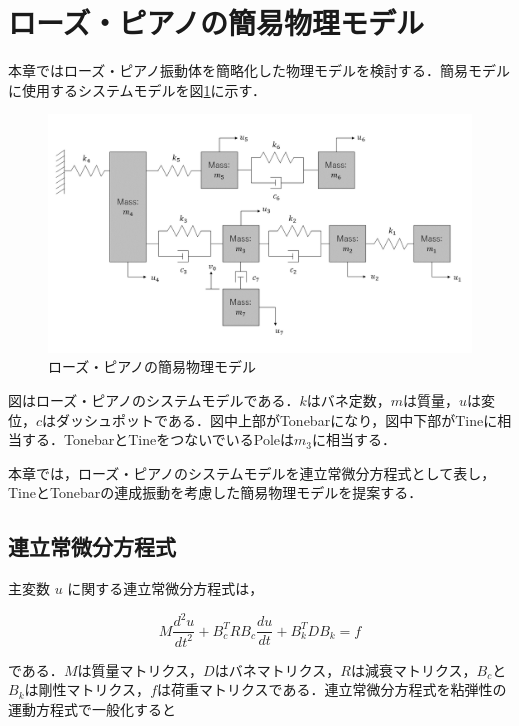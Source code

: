 \section{ローズ・ピアノの簡易物理モデル}

本章ではローズ・ピアノ振動体を簡略化した物理モデルを検討する．簡易モデルに使用するシステムモデルを図\ref{fig:簡易モデル}に示す．

\begin{figure}
    \centering
    \includegraphics[width=15cm]{img/system-model.png}
    \caption{ローズ・ピアノの簡易物理モデル}
    \label{fig:簡易モデル}
\end{figure}


図はローズ・ピアノのシステムモデルである．$k$はバネ定数，$m$は質量，$u$は変位，$c$はダッシュポットである．図中上部がTonebarになり，図中下部がTineに相当する．TonebarとTineをつないでいるPoleは$m_3$に相当する．

本章では，ローズ・ピアノのシステムモデルを連立常微分方程式として表し，TineとTonebarの連成振動を考慮した簡易物理モデルを提案する．



\subsection{連立常微分方程式}

主変数 $u$ に関する連立常微分方程式は，

\begin{equation}
    M \frac{d^2 u}{dt^2} + B_c^T R B_c \frac{du}{dt} + B_k^T D B_k = f    
\end{equation}

である．$M$は質量マトリクス，$D$はバネマトリクス，$R$は減衰マトリクス，$B_c$と$B_k$は剛性マトリクス，$f$は荷重マトリクスである．連立常微分方程式を粘弾性の運動方程式で一般化すると

